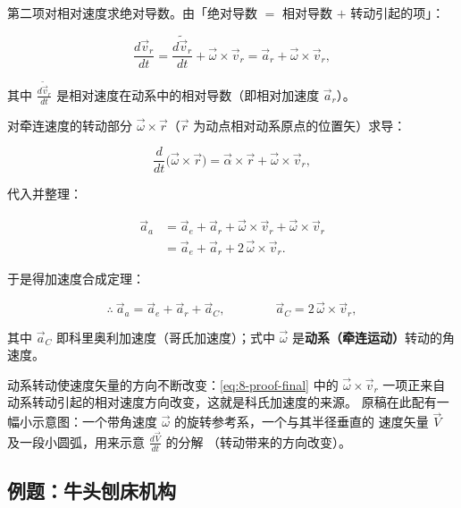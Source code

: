 第二项对相对速度求绝对导数。由「绝对导数 $=$ 相对导数 $+$ 转动引起的项」：

\begin{equation}\label{eq:8-proof-reldiff}
  \frac{d\vec v_r}{dt}
  = \frac{\widetilde{d\vec v_r}}{dt} + \vec\omega\times\vec v_r
  = \vec a_r + \vec\omega\times\vec v_r ,
\end{equation}

其中 $\frac{\widetilde{d\vec v_r}}{dt}$ 是相对速度在动系中的相对导数（即相对加速度 $\vec a_r$）。

对牵连速度的转动部分 $\vec\omega\times\vec r$（$\vec r$ 为动点相对动系原点的位置矢）求导：

\begin{equation}\label{eq:8-proof-ve-omega}
  \frac{d}{dt}\bigl(\vec\omega\times\vec r\bigr)
  = \vec\alpha\times\vec r + \vec\omega\times\vec v_r ,
\end{equation}

代入并整理：

\begin{equation}\label{eq:8-proof-expand}
\begin{aligned}
  \vec a_a
  &= \vec a_e + \vec a_r + \vec\omega\times\vec v_r + \vec\omega\times\vec v_r\\
  &= \vec a_e + \vec a_r + 2\,\vec\omega\times\vec v_r .
\end{aligned}
\end{equation}

于是得加速度合成定理：

\begin{equation}\label{eq:8-proof-final}
  \therefore\ \vec a_a = \vec a_e + \vec a_r + \vec a_C ,
  \qquad\qquad
  \vec a_C = 2\,\vec\omega\times\vec v_r ,
\end{equation}

其中 $\vec a_C$ 即科里奥利加速度（哥氏加速度）；式中 $\vec\omega$
是\textbf{动系（牵连运动）}转动的角速度。

\begin{remark}[动力学解释]
动系转动使速度矢量的方向不断改变：\eqref{eq:8-proof-final} 中的 $\vec\omega\times\vec v_r$
一项正来自动系转动引起的相对速度方向改变，这就是科氏加速度的来源。
原稿在此配有一幅小示意图：一个带角速度 $\vec\omega$ 的旋转参考系，一个与其半径垂直的
速度矢量 $\vec V$ 及一段小圆弧，用来示意 $\frac{d\vec V}{dt}$ 的分解
（转动带来的方向改变）。
\end{remark}

\subsection{例题：牛头刨床机构}

